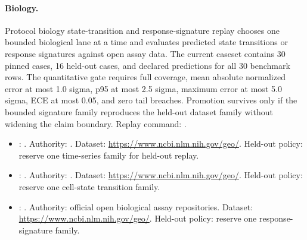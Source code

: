 \paragraph{Biology.}
Protocol
biology state-transition and response-signature replay
chooses one bounded biological lane at a time and evaluates predicted state
transitions or response signatures against open assay data. The current caseset
contains 30 pinned cases, 16 held-out cases, and declared predictions for all
30 benchmark rows. The quantitative gate requires full coverage, mean absolute
normalized error at most 1.0 sigma, p95 at most 2.5 sigma, maximum error at
most 5.0 sigma, ECE at most 0.05, and zero tail breaches. Promotion survives
only if the bounded signature family reproduces the held-out dataset family
without widening the claim boundary. Replay command:
.
\begin{itemize}[leftmargin=1.5em,nosep]
\item {}: . Authority: . Dataset: \url{https://www.ncbi.nlm.nih.gov/geo/}. Held-out policy: reserve one time-series family for held-out replay.
\item {}: . Authority: . Dataset: \url{https://www.ncbi.nlm.nih.gov/geo/}. Held-out policy: reserve one cell-state transition family.
\item {}: . Authority: official open biological assay repositories. Dataset: \url{https://www.ncbi.nlm.nih.gov/geo/}. Held-out policy: reserve one response-signature family.
\end{itemize}


